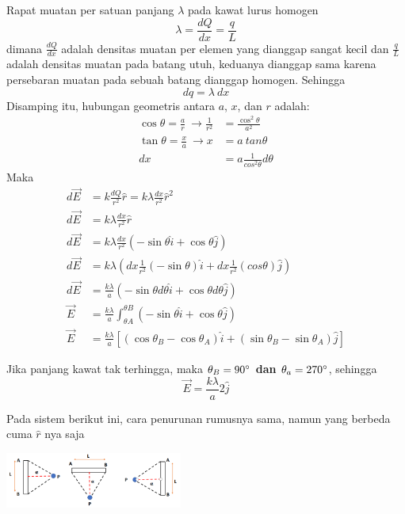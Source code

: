 \documentclass[twocolumn, 11pt]{article}%
\begin{document}
    Rapat muatan per satuan panjang $\lambda$ pada kawat lurus homogen
    \[ \lambda = \frac{dQ}{dx} = \frac{q}L \]
    dimana $\frac{dQ}{dx}$ adalah densitas muatan per elemen yang dianggap sangat kecil dan $\frac{q}L$ adalah densitas muatan pada batang utuh, keduanya dianggap sama karena persebaran muatan pada sebuah batang dianggap homogen. Sehingga
    \[ dq =  \lambda\ dx \]
    Disamping itu, hubungan geometris antara $a$, $x$, dan $r$ adalah:
    \begin{align*}
        \cos \theta = \frac{a}r\ \rightarrow \frac1{r^2} &= \frac{\cos^2 \theta}{a^2}\\
        \tan \theta = \frac{x}a\ \rightarrow x&=a\ tan \theta\\
        dx &= a \frac1{cos^2 \theta} d\theta
    \end{align*}
    Maka
    \begin{align*}
        d \vec E &= k \frac{dQ}{r^2} \hat r= k \lambda \frac{dx}{r^2} \hat r^2\\       
        d \vec E &= k \lambda \frac{dx}{r^2} \hat r\\
        d \vec E &= k \lambda \frac{dx}{r^2} (-\sin \theta \hat i + \cos \theta \hat j)\\
        d \vec E &= k \lambda  (dx \frac1{r^2} (-\sin \theta)\hat i + dx \frac1{r^2}(cos \theta) \hat j)\\
        d \vec E &= \frac{k \lambda}a (-\sin \theta d\theta \hat i +\cos \theta d\theta \hat j)\\
        \vec E &= \frac{k \lambda}a \int_{\theta A}^{\theta B} (-\sin \theta \hat i + \cos \theta \hat j)\\
        \vec E &= \frac{k \lambda}a [(\cos \theta_B - \cos \theta_A) \hat i + (\sin \theta_B - \sin \theta_A) \hat j ]
    \end{align*}

    Jika panjang kawat tak terhingga, maka \textbf{$\theta_B = 90 \degree$ dan $\theta_a=270 \degree$}, sehingga
    \[ \vec E = \frac{k \lambda}a 2 \hat j \]
    
    Pada sistem berikut ini, cara penurunan rumusnya sama, namun yang berbeda cuma $\hat r$ nya saja
    \begin{center}
        \includegraphics[width=220px]{11.png}
    \end{center}
    
\end{document}
